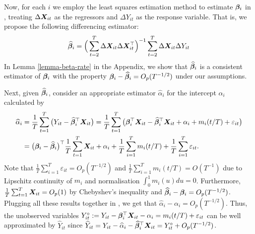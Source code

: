 \documentclass[a4paper,12pt]{article}
\makeatletter
\renewcommand{\eqref}[1]{\tagform@{\ref{#1}}}
\makeatother
\begin{document}
Now, for each $i$ we employ the least squares estimation method to estimate $\bm{\beta}_i$ in \eqref{model_with_regs}, treating $\Delta \boldsymbol{X}_{it}$ as the regressors and $\Delta Y_{it}$ as the response variable. That is, we propose the following differencing estimator:
\begin{align}\label{eq:beta:est}
\widehat{\bm{\beta}}_i = \Big( \sum_{t=2}^T \Delta \boldsymbol{X}_{it} \Delta \boldsymbol{X}_{it}^\top \Big)^{-1} \sum_{t=2}^T \Delta \boldsymbol{X}_{it} \Delta Y_{it}
\end{align}
In Lemma \ref{lemma-beta-rate} in the Appendix, we show that $\widehat{\bm{\beta}}_i$ is a consistent estimator of $\bm{\beta}_i$ with the property $\bm{\beta}_i - \widehat{\bm{\beta}}_i = O_p(T^{-1/2})$ under our assumptions. 

Next, given $\widehat{\bm{\beta}}_i$, consider an appropriate estimator $\widehat{\alpha}_{i}$ for the intercept $\alpha_i$ calculated by
\begin{align}
\widehat{\alpha}_i &= \frac{1}{T}\sum_{t=1}^T \big(Y_{it} - \widehat{\bm{\beta}}_i^\top \boldsymbol{X}_{it}\big) = \frac{1}{T}\sum_{t=1}^T \big(\bm{\beta}_i^\top \boldsymbol{X}_{it} - \widehat{\bm{\beta}}_i^\top \boldsymbol{X}_{it} + \alpha_i + m_i(t/T) + \varepsilon_{it}\big) \nonumber \\
&= \big(\bm{\beta}_i - \widehat{\bm{\beta}}_i \big)^\top\frac{1}{T}\sum_{t=1}^T  \boldsymbol{X}_{it} + \alpha_i + \frac{1}{T}\sum_{i=1}^T m_i(t/T) + \frac{1}{T}\sum_{i=1}^T \varepsilon_{it}. \label{eq:alpha:est}
\end{align}
Note that $\frac{1}{T}\sum_{i=1}^T \varepsilon_{it} = O_p(T^{-1/2})$ and $\frac{1}{T}\sum_{i=1}^T m_i(t/T) = O(T^{-1})$ due to Lipschitz continuity of $m_i$ and normalisation $\int_{0}^1 m_i(u)du = 0$. Furthermore, $\frac{1}{T}\sum_{t=1}^T  \boldsymbol{X}_{it} = O_p(1)$ by Chebyshev's inequality and $\widehat{\bm{\beta}}_i - \bm{\beta}_i = O_p (T^{-1/2})$. Plugging all these results together in \eqref{eq:alpha:est}, we get that $\widehat{\alpha}_i - \alpha_i = O_p(T^{-1/2})$. Thus, the unobserved variables \linebreak $Y_{it}^\circ := Y_{it} - \bm{\beta}_i^\top \boldsymbol{X}_{it} - \alpha_i = m_i(t/T) + \varepsilon_{it}$ can be well approximated by $\widehat{Y}_{it} $ since \linebreak $\widehat{Y}_{it} = Y_{it} -\widehat{\alpha}_i - \widehat{\bm{\beta}}_i^\top \boldsymbol{X}_{it} = Y_{it}^\circ + O_p(T^{-1/2})$.
\end{document}
